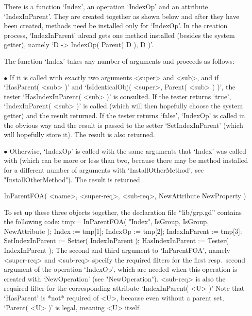 There  is  a function  `Index', an operation   `IndexOp' and an attribute
`IndexInParent'. They are created together as  shown below and after they
have been  created, methods need be  installed only for `IndexOp'. In the
creation  process,  `IndexInParent'  alread   gets  one method  installed
(besides the system getter), namely `D -> IndexOp( Parent( D ), D )'.

The function  `Index' takes   any number of  arguments and    proceeds as
follows:
\beginlist
\item{$\bullet$}
  If it is called  with exactly two arguments  <super> and <sub>,  and if
  `HasParent( <sub> )' and  `IsIdenticalObj( <super>, Parent( <sub> ) )',
  the tester `HasIndexInParent( <sub> )' is consulted.
  \itemitem{$\circ$}
    If  the  tester returns `true',  `IndexInParent(  <sub> )'  is called
    (which  will then hopefully choose  the system getter) and the result
    returned.
  \itemitem{$\circ$}
    If the tester returns `false', `IndexOp' is called in the obvious way
    and the result is passed to the setter `SetIndexInParent' (which will
    hopefully store it). The result is also returned.
\item{$\bullet$}
  Otherwise, `IndexOp' is called with the same arguments that `Index' was
  called with (which can be more  or less than two,  because there may be
  method    installed for     a  different  number   of   arguments  with
  `InstallOtherMethod',    see  "InstallOtherMethod").   The  result   is
  returned.
\endlist

\>InParentFOA( <name>, <super-req>, <sub-req>, NewAttribute \| %
  NewProperty )

To  set  up  these   three    objects  together, the  declaration    file
``lib/grp.gd'' contains the following code:
\begintt
    tmp:= InParentFOA( "Index", IsGroup, IsGroup, NewAttribute );
    Index         := tmp[1];
    IndexOp       := tmp[2];
    IndexInParent := tmp[3];
    SetIndexInParent := Setter( IndexInParent );
    HasIndexInParent := Tester( IndexInParent );
\endtt
The  second and third argument to  `InParentFOA',  namely <super-req> and
<sub-req> specify  the required   filters  for the first    resp.\ second
argument of the operation `IndexOp', which are needed when this operation
is  created with `NewOperation' (see  "NewOperation").  <sub-req> is also
the  required filter for the  corresponding attribute `IndexInParent( <U>
)' Note that `HasParent' is *not* required of <U>, because even without a
parent set, `Parent( <U> )' is legal, meaning <U> itself.


